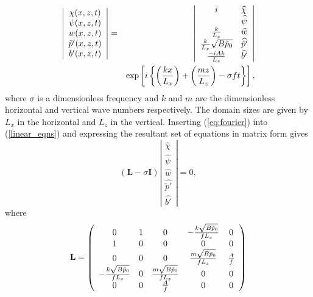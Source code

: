\documentclass[times]{qjrms4}
\begin{document}
  \begin{eqnarray} \label{eq:fourier}
     \left| \begin{array}{c}
     \chi(x,z,t) \\ \psi(x,z,t) \\ w(x,z,t) \\ \tilde{p}'(x,z,t) \\ b'(x,z,t)  \end{array} \right|  
     &= &\left| \begin{array}{cl} 
     i & \widehat{\chi} \\ & \widehat {\psi} \\  \frac{k}{L_x}  & \widehat{w} \\ \frac {k}{L_x} \sqrt{B \tilde{p}_0}  & \widehat {\tilde{p}'} \\ 
     \frac{-i Ak}   {L_x}  & \widehat{b'} \end{array} \right|  \nonumber \\
     && {\rm{exp}} \left[ i \left\{ \left( \frac{kx}{L_x} \right) + 
     \left( \frac{mz}{L_z} \right) - \sigma f t \right\} \right],
  \end{eqnarray}
where $\sigma $ is a dimensionless frequency and $k$ and $m$ are the dimensionless 
horizontal and vertical wave numbers respectively. The domain sizes are given by $L_x$
in the horizontal and $L_z$ in the vertical. 
%
Inserting  (\ref{eq:fourier}) into (\ref{linear_eqns}) and expressing the resultant set
of equations in matrix form gives
\begin{equation} \label{eq:spectral_system}
(\mathbf {L} - \sigma \mathbf{I})  
\left| 
  \begin{array}{c} 
       \widehat {\chi} \\ \widehat {\psi} \\  \widehat{w} \\ \widehat {\tilde{p}'} \\ \widehat{b'} 
  \end{array} 
\right| = 0,
\end{equation} 
where
\begin{equation} \label{eq:def_L_mat}
\mathbf{L} = \left( \begin{array}{c c c c c} 
0 & 1 & 0 & - \frac{k \sqrt{B\tilde{p}_0}}{f L_x} & 0 \\
1 & 0 & 0 & 0 & 0 \\
0 & 0 & 0 & \frac{m \sqrt{B\tilde{p}_0}}{f L_z}& \frac{A}{f}\\
- \frac{k \sqrt{B\tilde{p}_0}}{f L_x} & 0 & \frac{m \sqrt{B\tilde{p}_0}}{f L_z} & 0 & 0 \\
0 & 0 & \frac{A}{f} & 0 &  0  \\
\end{array} \right) 
\end{equation}
\end{document}
